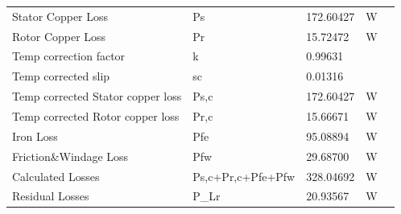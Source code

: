 \begin{table}[hbtp!]
\begin{tabular}{
    >{\columncolor[HTML]{9B9B9B}}l llll}
    Stator   Copper Loss                                & \cellcolor[HTML]{F2F2F2}Ps                & \cellcolor[HTML]{F2F2F2}172.60427 & \cellcolor[HTML]{F2F2F2}W    &  \\
    Rotor   Copper Loss                                 & Pr                                        & 15.72472                          & W                            &  \\
    Temp   correction factor                            & \cellcolor[HTML]{F2F2F2}k                 & \cellcolor[HTML]{F2F2F2}0.99631   & \cellcolor[HTML]{F2F2F2}     &  \\
    Temp   corrected slip                               & sc                                        & 0.01316                           &                              &  \\
    Temp   corrected Stator copper loss                 & \cellcolor[HTML]{F2F2F2}Ps,c              & \cellcolor[HTML]{F2F2F2}172.60427 & \cellcolor[HTML]{F2F2F2}W    &  \\
    Temp   corrected Rotor copper loss                  & Pr,c                                      & 15.66671                          & W                            &  \\
    Iron Loss                                           & \cellcolor[HTML]{F2F2F2}Pfe               & \cellcolor[HTML]{F2F2F2}95.08894 & \cellcolor[HTML]{F2F2F2}W    &  \\
    Friction\&Windage   Loss                            & Pfw                                       & 29.68700                          & W                            &  \\
    Calculated   Losses                                 & \cellcolor[HTML]{F2F2F2}Ps,c+Pr,c+Pfe+Pfw & \cellcolor[HTML]{F2F2F2}328.04692 & \cellcolor[HTML]{F2F2F2}W    &  \\
    Residual   Losses                                   & P\_Lr                                     & 20.93567                          & W                            & 
\end{tabular}
\end{table}

